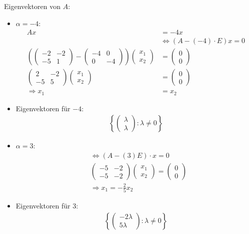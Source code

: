 Eigenvektoren von $A$:
\begin{itemize}
\item $\alpha = -4$: 
\begin{align}
Ax &= -4x \\
&\Leftrightarrow (A-(-4)\cdot E)x = 0 \\
\left( \begin{pmatrix} -2 & -2 \\ -5 & 1 \end{pmatrix} - \begin{pmatrix} -4 & 0 \\ 0 & -4 \end{pmatrix} \right) \begin{pmatrix} x_1 \\ x_2 \end{pmatrix} &= \begin{pmatrix} 0 \\ 0 \end{pmatrix} \\
\begin{pmatrix} 2 & -2 \\ -5 & 5\end{pmatrix} \begin{pmatrix} x_1 \\ x_2 \end{pmatrix} &= \begin{pmatrix} 0 \\ 0 \end{pmatrix} \\
\Rightarrow x_1 &= x_2
\end{align}
\item Eigenvektoren für $-4$:
\begin{align}
\left\{ \begin{pmatrix} \lambda \\ \lambda \end{pmatrix}: \lambda \neq 0 \right\}
\end{align}
\item $\alpha = 3$:
\begin{align}
&\Leftrightarrow (A - (3)E)\cdot x = 0 \\
&\begin{pmatrix} -5 & -2 \\ -5 & -2\end{pmatrix} \begin{pmatrix} x_1 \\ x_2\end{pmatrix} = \begin{pmatrix} 0 \\ 0 \end{pmatrix} \\
&\Rightarrow x_1 = - \frac{2}{5} x_2
\end{align}
\item Eigenvektoren für 3: 
\begin{align}
\left\{ \begin{pmatrix} -2 \lambda \\ 5 \lambda \end{pmatrix}: \lambda \neq 0 \right\}
\end{align}
\end{itemize}
